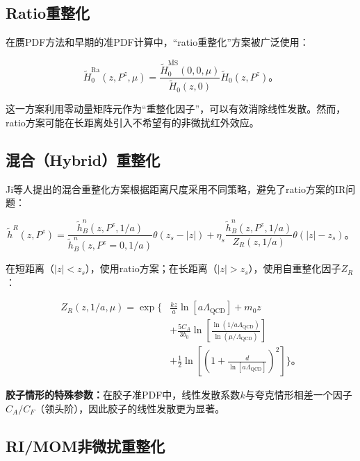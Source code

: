 \documentclass[12pt,a4paper]{ctexart}
\theoremstyle{definition}
\begin{document}
\subsection{Ratio重整化}

在赝PDF方法和早期的准PDF计算中，``ratio重整化''方案被广泛使用\cite{Fan2018gluon}：

\begin{equation}
\tilde{H}^{\text{Ra}}_0(z, P^z, \mu) = \frac{\tilde{H}^{\overline{\text{MS}}}_0(0, 0, \mu)}{\tilde{H}_0(z, 0)} \tilde{H}_0(z, P^z)。
\label{eq:ratio_renorm}
\end{equation}

这一方案利用零动量矩阵元作为``重整化因子''，可以有效消除线性发散。然而，ratio方案可能在长距离处引入不希望有的非微扰红外效应\cite{Ji2021hybrid}。

\subsection{混合（Hybrid）重整化}

Ji等人提出的混合重整化方案\cite{Ji2021hybrid}根据距离尺度采用不同策略，避免了ratio方案的IR问题：

\begin{equation}
\tilde{h}^R(z, P^z) = \frac{\tilde{h}^n_B(z, P^z, 1/a)}{\tilde{h}^n_B(z, P^z=0, 1/a)} \theta(z_s - |z|) + \eta_s \frac{\tilde{h}^n_B(z, P^z, 1/a)}{Z_R(z, 1/a)} \theta(|z| - z_s)。
\label{eq:hybrid_renorm}
\end{equation}

在短距离（$|z| < z_s$），使用ratio方案；在长距离（$|z| > z_s$），使用自重整化因子$Z_R$：

\begin{equation}
\begin{aligned}
Z_R(z, 1/a, \mu) = \exp\Bigg\{&\frac{kz}{a}\ln[a\Lambda_{\text{QCD}}] + m_0 z \\
&+ \frac{5C_A}{3b_0} \ln\left[\frac{\ln(1/a\Lambda_{\text{QCD}})}{\ln(\mu/\Lambda_{\text{QCD}})}\right] \\
&+ \frac{1}{2}\ln\left[\left(1 + \frac{d}{\ln[a\Lambda_{\text{QCD}}]}\right)^2\right]\Bigg\}。
\end{aligned}
\label{eq:ZR}
\end{equation}

\textbf{胶子情形的特殊参数：}在胶子准PDF中，线性发散系数$k$与夸克情形相差一个因子$C_A/C_F$（领头阶），因此胶子的线性发散更为显著\cite{Chen2025gluon}。

\subsection{RI/MOM非微扰重整化}
\end{document}
